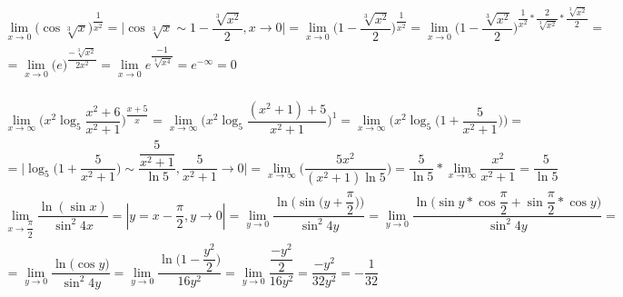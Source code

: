 \documentclass[12pt]{article}
\begin{document}
\\
$$
\begin{array}{l}
	\lim\limits_{x\rightarrow0}\biggl(\cos{\sqrt[3]{x}}\biggl)^{\dfrac{1}{x^2}}=\biggl| \cos{\sqrt[3]{x}} \sim 1-\dfrac{\sqrt[3]{x^2}}{2}, x \to 0 \biggl|=\lim\limits_{x\rightarrow0} \biggl(1-\dfrac{\sqrt[3]{x^2}}{2}\biggl)^{\dfrac{1}{x^2}} = \lim\limits_{x\rightarrow0}\biggl(1-\dfrac{\sqrt[3]{x^2}}{2}\biggl)^{\dfrac{1}{x^2}*\dfrac{2}{\sqrt[3]{x^2}}*\dfrac{\sqrt[3]{x^2}}{2}}=\\=\lim\limits_{x\rightarrow0}\biggl(e\biggl)^{\dfrac{-\sqrt[3]{x^2}}{2x^2}}= \lim\limits_{x\rightarrow0}e^{\dfrac{-1}{\sqrt[3]{x^4}}}=e^{-\infty}=0
\end{array}
$$
\\
$$
\begin{array}{l}
\lim\limits_{x\rightarrow\infty} \biggl(x^2\log_{5}\dfrac{x^2+6}{x^2+1}\biggl)^{\dfrac{x+5}{x}}=\lim\limits_{x\rightarrow\infty} \biggl(x^2\log_{5}\dfrac{(x^2+1)+5}{x^2+1}\biggl)^1=\lim\limits_{x\rightarrow\infty}\biggl(x^2\log_{5}\big({1+\dfrac{5}{x^2+1}}\big)\biggl)=\\=\biggl| \log_{5}\biggl({1+\dfrac{5}{x^2+1}}\biggl) \sim \dfrac{\dfrac{5}{x^2+1}}{\ln{5}}, {\dfrac{5}{x^2+1}} \to 0 \biggl|=\lim\limits_{x\rightarrow\infty}\biggl(\dfrac{5x^2}{(x^2+1)\ln{5}}\biggl)=\dfrac{5}{\ln{5}}*\lim\limits_{x\rightarrow\infty}\dfrac{x^2}{x^2+1}=\dfrac{5}{\ln{5}}
\end{array}
$$
$$
\begin{array}{l}
\lim\limits_{x\rightarrow\dfrac{\pi}{2}} \dfrac{\ln(\sin{x})}{\sin^2{4x}}=\left| y=x-\dfrac{\pi}{2}, y \to 0\right|= \lim\limits_{y\rightarrow0}\dfrac{\ln{\biggl(\sin{\big(y+\dfrac{\pi}{2}\big)}\biggl)}}{\sin^2{4y}}=\lim\limits_{y\rightarrow0}\dfrac{\ln{\biggl(\sin{y}*\cos{\dfrac{\pi}{2}}+\sin{\dfrac{\pi}{2}}*\cos{y}\biggl)}}{\sin^2{4y}}=\\=\lim\limits_{y\rightarrow0}\dfrac{\ln{\big(\cos{y}\big)}}{\sin^2{4y}}=\lim\limits_{y\rightarrow0}\dfrac{\ln{\big(1-\dfrac{y^2}{2}\big)}}{16y^2}=\lim\limits_{y\rightarrow0}\dfrac{\dfrac{-y^2}{2}}{16y^2}=\dfrac{-y^2}{32y^2}=-\dfrac{1}{32}
\end{array} $$
\newpage
\end{document}
